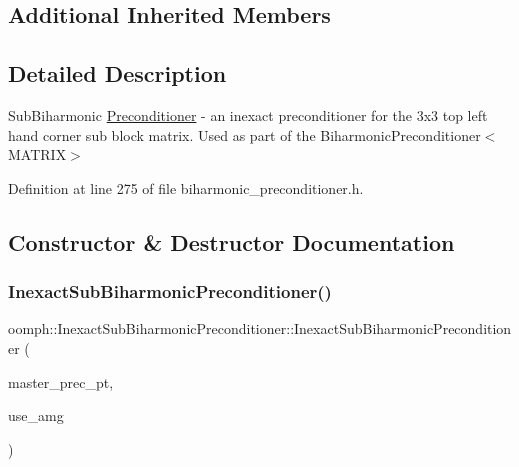 \subsection*{Additional Inherited Members}


\subsection{Detailed Description}
Sub\+Biharmonic \hyperlink{classoomph_1_1Preconditioner}{Preconditioner} -\/ an inexact preconditioner for the 3x3 top left hand corner sub block matrix. Used as part of the Biharmonic\+Preconditioner$<$\+M\+A\+T\+R\+I\+X$>$ 

Definition at line 275 of file biharmonic\+\_\+preconditioner.\+h.



\subsection{Constructor \& Destructor Documentation}
\mbox{\label{classoomph_1_1InexactSubBiharmonicPreconditioner_a495fa2a59d5511ec58813e7eca2e371e}} 
\subsubsection{\texorpdfstring{Inexact\+Sub\+Biharmonic\+Preconditioner()}{InexactSubBiharmonicPreconditioner()}\hspace{0.1cm}{\footnotesize\ttfamily [1/2]}}
{\footnotesize\ttfamily oomph\+::\+Inexact\+Sub\+Biharmonic\+Preconditioner\+::\+Inexact\+Sub\+Biharmonic\+Preconditioner (\begin{DoxyParamCaption}\item[{\hyperlink{classoomph_1_1BiharmonicPreconditioner}{Biharmonic\+Preconditioner} $\ast$}]{master\+\_\+prec\+\_\+pt,  }\item[{const bool}]{use\+\_\+amg }\end{DoxyParamCaption})\hspace{0.3cm}{\ttfamily [inline]}}



